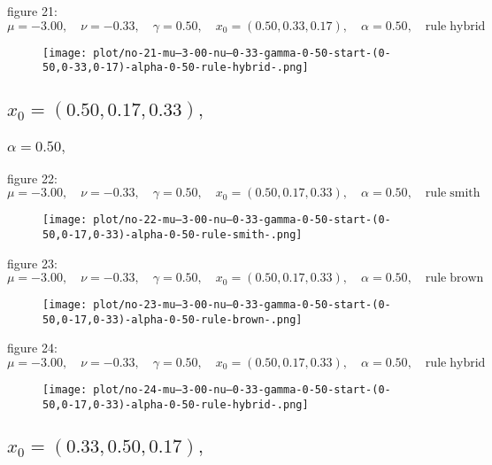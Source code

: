 \documentclass[a4paper]{article}
\begin{document}
\begin{multicols*}{2}
figure 21: \(\mu = -3.00,\quad \nu = -0.33,\quad \gamma = 0.50,\quad x_0 = (0.50,0.33,0.17),\quad \alpha = 0.50,\quad \mathrm{rule} \; \mathrm{hybrid}\)
   \begin{figure}[H]
   \centering
   \texttt{[image: plot/no-21-mu--3-00-nu--0-33-gamma-0-50-start-(0-50,0-33,0-17)-alpha-0-50-rule-hybrid-.png]}
   \end{figure}
   

   \subsection{\(x_0 = (0.50,0.17,0.33),\quad \)}
   

   \subsubsection{\(\alpha = 0.50,\quad \)}
   
figure 22: \(\mu = -3.00,\quad \nu = -0.33,\quad \gamma = 0.50,\quad x_0 = (0.50,0.17,0.33),\quad \alpha = 0.50,\quad \mathrm{rule} \; \mathrm{smith}\)
   \begin{figure}[H]
   \centering
   \texttt{[image: plot/no-22-mu--3-00-nu--0-33-gamma-0-50-start-(0-50,0-17,0-33)-alpha-0-50-rule-smith-.png]}
   \end{figure}
   
figure 23: \(\mu = -3.00,\quad \nu = -0.33,\quad \gamma = 0.50,\quad x_0 = (0.50,0.17,0.33),\quad \alpha = 0.50,\quad \mathrm{rule} \; \mathrm{brown}\)
   \begin{figure}[H]
   \centering
   \texttt{[image: plot/no-23-mu--3-00-nu--0-33-gamma-0-50-start-(0-50,0-17,0-33)-alpha-0-50-rule-brown-.png]}
   \end{figure}
   
figure 24: \(\mu = -3.00,\quad \nu = -0.33,\quad \gamma = 0.50,\quad x_0 = (0.50,0.17,0.33),\quad \alpha = 0.50,\quad \mathrm{rule} \; \mathrm{hybrid}\)
   \begin{figure}[H]
   \centering
   \texttt{[image: plot/no-24-mu--3-00-nu--0-33-gamma-0-50-start-(0-50,0-17,0-33)-alpha-0-50-rule-hybrid-.png]}
   \end{figure}
   

   \subsection{\(x_0 = (0.33,0.50,0.17),\quad \)}
   


\end{multicols*}
\end{document}
